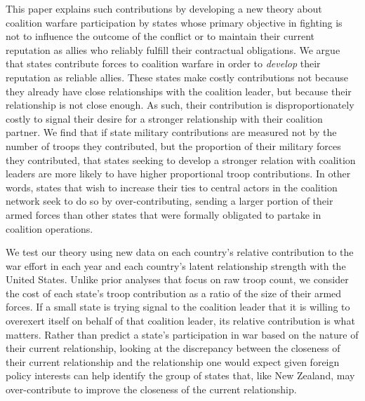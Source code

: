 \documentclass[12pt,letterpaper]{article}
\begin{document}
	This paper explains such contributions by developing a new theory about coalition warfare participation by states whose primary objective in fighting is not to influence the outcome of the conflict or to maintain their current reputation as allies who reliably fulfill their contractual obligations. We argue that states contribute forces to coalition warfare in order to \textit{develop} their reputation as reliable allies. These states make costly contributions not because they already have close relationships with the coalition leader, but because their relationship is not close enough. As such, their contribution is disproportionately costly to signal their desire for a stronger relationship with their coalition partner. We find that if state military contributions are measured not by the number of troops they contributed, but the proportion of their military forces they contributed, that states seeking to develop a stronger relation with coalition leaders are more likely to have higher proportional troop contributions. In other words, states that wish to increase their ties to central actors in the coalition network seek to do so by over-contributing, sending a larger portion of their armed forces than other states that were formally obligated to partake in coalition operations.
	
	We test our theory using new data on each country's relative contribution to the war effort in each year and each country's latent relationship strength with the United States. Unlike prior analyses that focus on raw troop count, we consider the cost of each state's troop contribution as a ratio of the size of their armed forces. If a small state is trying signal to the coalition leader that it is willing to overexert itself on behalf of that coalition leader, its relative contribution is what matters. Rather than predict a state's participation in war based on the nature of their current relationship, looking at the discrepancy between the closeness of their current relationship and the relationship one would expect given foreign policy interests can help identify the group of states that, like New Zealand, may over-contribute to improve the closeness of the current relationship.
	
\end{document}
